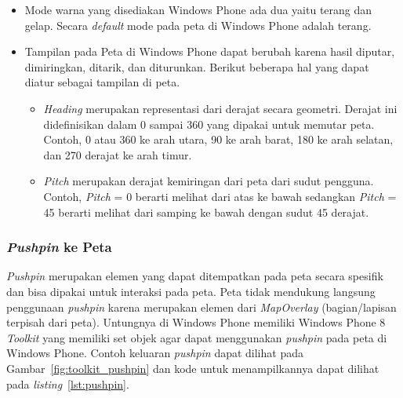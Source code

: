 \begin{itemize}
	\item	Mode warna yang disediakan Windows Phone ada dua yaitu terang dan gelap. Secara \textit{default} mode pada peta di Windows Phone adalah terang.
	
	\item Tampilan pada Peta di Windows Phone dapat berubah karena hasil diputar, dimiringkan, ditarik, dan diturunkan. Berikut beberapa hal yang dapat diatur sebagai tampilan di peta.
	
		\begin{itemize}
			\item \textit{Heading} merupakan representasi dari derajat secara geometri. Derajat ini didefinisikan dalam 0 sampai 360 yang dipakai untuk memutar peta. Contoh, 0 atau 360 ke arah utara, 90 ke arah barat, 180 ke arah selatan, dan 270 derajat ke arah timur.
			\item \textit{Pitch} merupakan derajat kemiringan dari peta dari sudut pengguna. Contoh, \textit{Pitch} = 0 berarti melihat dari atas ke bawah sedangkan \textit{Pitch} = 45 berarti melihat dari samping ke bawah dengan sudut 45 derajat.
		\end{itemize} 
\end{itemize}

\subsubsection{\textit{Pushpin} ke Peta}
\label{subsubsec:Pushpin ke Peta}
\hspace{0.5cm} \textit{Pushpin} merupakan elemen yang dapat ditempatkan pada peta secara spesifik dan bisa dipakai untuk interaksi pada peta. Peta tidak mendukung langsung penggunaan \textit{pushpin} karena merupakan elemen dari \textit{MapOverlay} (bagian/lapisan terpisah dari peta). Untungnya di Windows Phone memiliki Windows Phone 8 \textit{Toolkit} yang memiliki set objek agar dapat menggunakan \textit{pushpin} pada peta di Windows Phone. Contoh keluaran \textit{pushpin} dapat dilihat pada Gambar~\ref{fig:toolkit_pushpin} dan kode untuk menampilkannya dapat dilihat pada \textit{listing}~\ref{lst:pushpin}.

